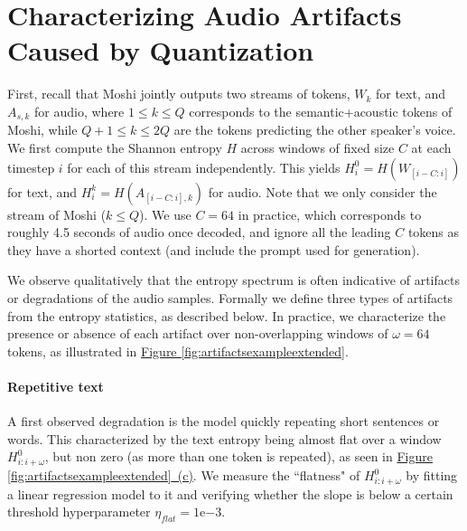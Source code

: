 \newpage
\section{Characterizing Audio Artifacts Caused by Quantization}
\label{app:artifactsmetric}

First, recall that Moshi jointly outputs two streams of  tokens, $W_{k}$ for text, and $A_{s, k}$ for audio, where $1 \leq k \leq Q$ corresponds to the semantic+acoustic tokens of Moshi, while $Q + 1 \leq k \leq 2Q $ are the tokens predicting the other speaker's voice. 
We first compute the Shannon entropy $H$ across windows of fixed size $C$ at each timestep $i$ for each of this stream independently. This yields $H^{0}_i = H(W_{[i - C: i]})$ for text, and   $H^{k}_i = H(A_{[i - C: i], k})$ for audio. Note that we only consider the stream of Moshi ($k \leq Q$). We use  $C = 64$ in practice, which corresponds to roughly 4.5 seconds of audio once decoded, and ignore all the leading $C$ tokens as they have a shorted context (and include the prompt used for generation).

We observe qualitatively that the entropy spectrum is often indicative of artifacts or degradations of the audio samples. 
Formally we define three types of  artifacts from the entropy statistics, as described below. In practice, we characterize the presence or absence of each artifact over non-overlapping windows of  $\omega = 64$ tokens, as illustrated in \hyperref[fig:artifactsexampleextended]{Figure \ref{fig:artifactsexampleextended}}. 
\paragraph{Repetitive text}
A first observed degradation is the model quickly repeating short sentences or words. This characterized by the text entropy being almost flat over a window $H^0_{i:i+\omega}$, but non zero (as more than one token is repeated), as seen in  \hyperref[fig:artifactsexampleextended]{Figure \ref{fig:artifactsexampleextended}\ (c)}. We measure the ``flatness" of $H^0_{i:i+\omega}$ by fitting a linear regression model to it and verifying whether the slope is below a certain threshold hyperparameter $\eta_{flat} = 1\mathrm{e}{-3}$.
